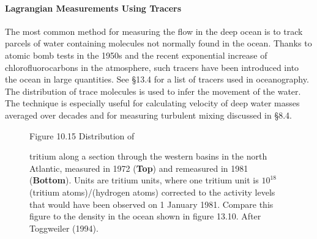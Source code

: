 \paragraph{Lagrangian Measurements Using Tracers}
The most common
method for measuring the flow in the deep ocean is to track parcels of
water containing molecules not normally found in the ocean.  Thanks to
atomic bomb tests in the 1950s and the recent exponential increase of
chlorofluorocarbons in the atmosphere, such tracers have been
introduced into the ocean in large quantities. See \S 13.4 for a list
of tracers used in oceanography. The distribution of trace molecules
is used to infer the movement of the water. The technique is
especially useful for calculating velocity of deep water masses
averaged over decades and for measuring turbulent mixing discussed in
\S 8.4.

\begin{figure}[t!]
\footnotesize
Figure 10.15 Distribution of \rule{0pt}{3ex} tritium along a section
through the western basins in the north Atlantic, measured in 1972
(\textbf{Top}) and remeasured in 1981 (\textbf{Bottom}). Units are
tritium units, where one tritium unit is $10^{18}$ (tritium
atoms)/(hydrogen atoms) corrected to the activity levels that would
have been observed on 1 January 1981. Compare this figure to the
density in the ocean shown in figure 13.10. After Toggweiler (1994).
\label{fig:tritium}
\vspace{-5ex}
\end{figure}

